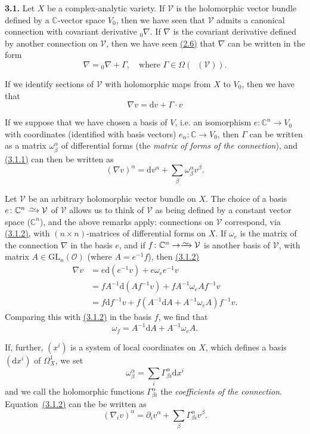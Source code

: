 \documentclass{report}
\newenvironment{rmenv}[1]
  {\phantomsection\par\medskip\noindent\textbf{#1.}\rmfamily}
  {\par\medskip}
\renewcommand{\cal}[1]{{\mathcal{#1}}}
\newcommand{\CC}{\mathbb{C}}
\newcommand{\dd}{\mathrm{d}}
\newcommand{\GL}{\mathrm{GL}}
\newcommand{\simto}{\xrightarrow{\raisebox{-0.7ex}[0ex][0ex]{$\sim$}}}
\DeclareMathOperator{\shEnd}{\underline{End}}
\newcommand{\oldpage}[1]{\marginpar{\footnotesize$\Big\vert$ \textit{p.~#1}}}
\begin{document}
\begin{rmenv}{3.1}
\label{I.3.1}
  Let $X$ be a complex-analytic variety.
  If $\cal{V}$ is the holomorphic vector bundle defined by a $\CC$-vector space $V_0$, then we have seen that $\cal{V}$ admits a canonical connection with covariant derivative ${}_0\!\nabla$.
  If $\nabla$ is the covariant derivative defined by another connection on $\cal{V}$, then we have seen \hyperref[I.2.6]{(2.6)} that $\nabla$ can be written in the form
  \[
    \nabla = {}_0\!\nabla + \Gamma,
    \quad\mbox{where $\Gamma\in\Omega(\shEnd(\cal{V}))$.}
  \]

  If we identify sections of $\cal{V}$ with holomorphic maps from $X$ to $V_0$, then we have that
  \[
  \label{I.3.1.1}
    \nabla v = \dd v + \Gamma\cdot v
  \tag{3.1.1}
  \]

  If we suppose that we have chosen a basis of $V$, i.e. an isomorphism $e\colon\CC^n\to V_0$ with coordinates (identified with basis vectors) $e_\alpha\colon\CC\to V_0$, then $\Gamma$ can be written as a matrix $\omega_\beta^\alpha$ of differential forms (the \emph{matrix of forms of the connection}), and \hyperref[I.3.1.1]{(3.1.1)} can then be written as
  \[
  \label{I.3.1.2}
    (\nabla v)^\alpha = \dd v^\alpha + \sum_\beta \omega_\beta^\alpha v^\beta.
  \tag{3.1.2}
  \]

  Let $\cal{V}$ be an arbitrary holomorphic vector bundle on $X$.
  The choice of a basis $e\colon\CC^n\simto\cal{V}$ of $\cal{V}$ allows us to think of $\cal{V}$ as being defined by a
\oldpage{22}
  constant vector space ($\CC^n$), and the above remarks apply:
  connections on $\cal{V}$ correspond, via \hyperref[I.3.1.2]{(3.1.2)}, with $(n\times n)$-matrices of differential forms on $X$.
  If $\omega_e$ is the matrix of the connection $\nabla$ in the basis $e$, and if $f\colon\CC^n\to\simto\cal{V}$ is another basis of $\cal{V}$, with matrix $A\in\GL_n(\cal{O})$ (where $A=e^{-1}f$), then \hyperref[I.3.1.2]{(3.1.2)}
  \[
    \begin{aligned}
      \nabla v
      &= e\dd(e^{-1}v) + e\omega_e e^{-1}v
    \\&= fA^{-1}\dd(Af^{-1}v) + fA^{-1}\omega_e Af^{-1}v
    \\&= f\dd f^{-1}v + f(A^{-1}\dd A + A^{-1}\omega_e A)f^{-1}v.
    \end{aligned}
  \]
  Comparing this with \hyperref[I.3.1.2]{(3.1.2)} in the basis $f$, we find that
  \[
  \label{I.3.1.3}
    \omega_f = A^{-1}\dd A + A^{-1}\omega_e A.
  \tag{3.1.3}
  \]

  If, further, $(x^i)$ is a system of local coordinates on $X$, which defines a basis $(\dd x^i)$ of $\Omega_X^1$, we set
  \[
    \omega_\beta^\alpha = \sum_i \Gamma_{\beta i}^\alpha \dd x^i
  \]
  and we call the holomorphic functions $\Gamma_{\beta i}^\alpha$ the \emph{coefficients of the connection}.
  Equation~\hyperref[I.3.1.2]{(3.1.2)} can the be written as
  \[
  \label{I.3.1.4}
    (\nabla_i v)^\alpha = \partial_i v^\alpha + \sum_\beta \Gamma_{\beta i}^\alpha v^\beta.
  \tag{3.1.4}
  \]


\end{rmenv}
\end{document}
